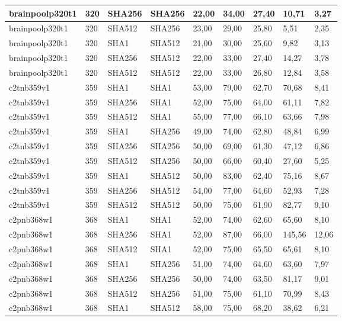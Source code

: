 \begin{longtable}{| l | l | l | l | l |l |l |l |l |}
brainpoolp320t1 & 320 & SHA256 & SHA256 & 22,00 & 34,00 & 27,40 & 10,71 & 3,27 \\ \hline 
brainpoolp320t1 & 320 & SHA512 & SHA256 & 23,00 & 29,00 & 25,80 & 5,51 & 2,35 \\ \hline 
brainpoolp320t1 & 320 & SHA1 & SHA512 & 21,00 & 30,00 & 25,60 & 9,82 & 3,13 \\ \hline 
brainpoolp320t1 & 320 & SHA256 & SHA512 & 22,00 & 33,00 & 27,40 & 14,27 & 3,78 \\ \hline 
brainpoolp320t1 & 320 & SHA512 & SHA512 & 22,00 & 33,00 & 26,80 & 12,84 & 3,58 \\ \hline 
c2tnb359v1 & 359 & SHA1 & SHA1 & 53,00 & 79,00 & 62,70 & 70,68 & 8,41 \\ \hline 
c2tnb359v1 & 359 & SHA256 & SHA1 & 52,00 & 75,00 & 64,00 & 61,11 & 7,82 \\ \hline 
c2tnb359v1 & 359 & SHA512 & SHA1 & 55,00 & 77,00 & 66,10 & 63,66 & 7,98 \\ \hline 
c2tnb359v1 & 359 & SHA1 & SHA256 & 49,00 & 74,00 & 62,80 & 48,84 & 6,99 \\ \hline 
c2tnb359v1 & 359 & SHA256 & SHA256 & 50,00 & 69,00 & 61,30 & 47,12 & 6,86 \\ \hline 
c2tnb359v1 & 359 & SHA512 & SHA256 & 50,00 & 66,00 & 60,40 & 27,60 & 5,25 \\ \hline 
c2tnb359v1 & 359 & SHA1 & SHA512 & 50,00 & 83,00 & 62,40 & 75,16 & 8,67 \\ \hline 
c2tnb359v1 & 359 & SHA256 & SHA512 & 54,00 & 77,00 & 64,60 & 52,93 & 7,28 \\ \hline 
c2tnb359v1 & 359 & SHA512 & SHA512 & 50,00 & 75,00 & 61,90 & 82,77 & 9,10 \\ \hline 
c2pnb368w1 & 368 & SHA1 & SHA1 & 52,00 & 74,00 & 62,60 & 65,60 & 8,10 \\ \hline 
c2pnb368w1 & 368 & SHA256 & SHA1 & 52,00 & 87,00 & 66,00 & 145,56 & 12,06 \\ \hline 
c2pnb368w1 & 368 & SHA512 & SHA1 & 52,00 & 75,00 & 65,50 & 65,61 & 8,10 \\ \hline 
c2pnb368w1 & 368 & SHA1 & SHA256 & 51,00 & 74,00 & 64,60 & 63,60 & 7,97 \\ \hline 
c2pnb368w1 & 368 & SHA256 & SHA256 & 50,00 & 74,00 & 63,50 & 81,17 & 9,01 \\ \hline 
c2pnb368w1 & 368 & SHA512 & SHA256 & 51,00 & 75,00 & 61,10 & 70,99 & 8,43 \\ \hline 
c2pnb368w1 & 368 & SHA1 & SHA512 & 58,00 & 75,00 & 68,20 & 38,62 & 6,21 \\ \hline 

\end{longtable}
